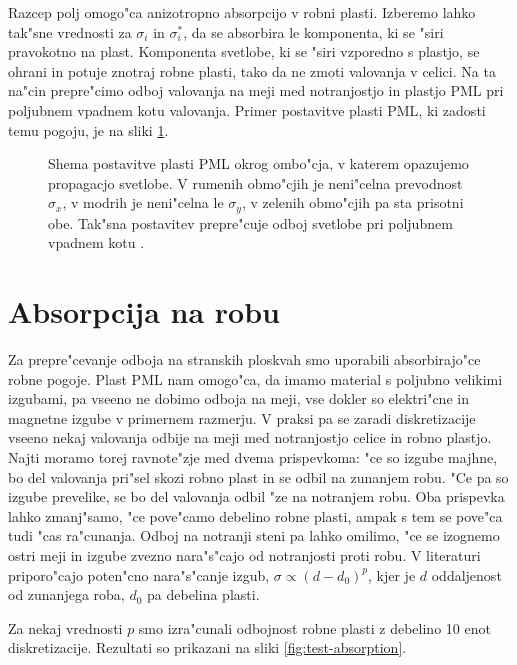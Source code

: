 \documentclass[12pt,twoside,openright,final]{report}
\begin{document}
Razcep polj omogo"ca anizotropno absorpcijo v robni plasti. 
Izberemo lahko tak"sne vrednosti za $\sigma_i$ in $\sigma^\ast_i$, da se absorbira le komponenta, ki se "siri pravokotno na plast. 
Komponenta svetlobe, ki se "siri vzporedno s plastjo, se ohrani in potuje znotraj robne plasti, tako da ne zmoti valovanja v celici. 
Na ta na"cin prepre"cimo odboj valovanja na meji med notranjostjo in plastjo \acs{PML} pri poljubnem vpadnem kotu valovanja. 
Primer postavitve plasti \acs{PML}, ki zadosti temu pogoju, je na sliki \ref{fig:pml-shema}. 

\begin{figure}[!htbp]
 \centering
 \def\svgwidth{.4\textwidth}
 
 \caption{Shema postavitve plasti \acs{PML} okrog ombo"cja, v katerem opazujemo propagacjo svetlobe. V rumenih obmo"cjih je neni"celna prevodnost $\sigma_x$, v modrih je neni"celna le $\sigma_y$, v zelenih obmo"cjih pa sta prisotni obe. Tak"sna postavitev prepre"cuje odboj svetlobe pri poljubnem vpadnem kotu \cite{taflove}. }
 \label{fig:pml-shema}
\end{figure}

\section{Absorpcija na robu}
Za prepre"cevanje odboja na stranskih ploskvah smo uporabili absorbirajo"ce robne pogoje. 
Plast \acs{PML} nam omogo"ca, da imamo material s poljubno velikimi izgubami, pa vseeno ne dobimo odboja na meji, vse dokler so elektri"cne in magnetne izgube v primernem razmerju. 
V praksi pa se zaradi diskretizacije vseeno nekaj valovanja odbije na meji med notranjostjo celice in robno plastjo. 
Najti moramo torej ravnote"zje med dvema prispevkoma: "ce so izgube majhne, bo del valovanja pri"sel skozi robno plast in se odbil na zunanjem robu. 
"Ce pa so izgube prevelike, se bo del valovanja odbil "ze na notranjem robu. 
Oba prispevka lahko zmanj"samo, "ce pove"camo debelino robne plasti, ampak s tem se pove"ca tudi "cas ra"cunanja. 
Odboj na notranji steni pa lahko omilimo, "ce se izognemo ostri meji in izgube zvezno nara"s"cajo od notranjosti proti robu. 
V literaturi \cite{taflove} priporo"cajo poten"cno nara"s"canje izgub, $\sigma \propto (d-d_0)^{p}$, kjer je $d$ oddaljenost od zunanjega roba, $d_0$ pa debelina plasti. 

Za nekaj vrednosti $p$ smo izra"cunali odbojnost robne plasti z debelino 10 enot diskretizacije. 
Rezultati so prikazani na sliki \ref{fig:test-absorption}. 
\end{document}
